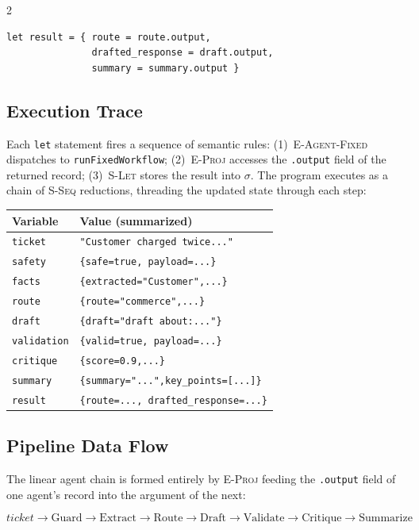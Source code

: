 \documentclass[10pt]{article}
\begin{document}
\begin{multicols}{2}
\begin{lstlisting}[style=awl,
    caption={Customer support triage (abridged)}]
let result = { route = route.output,
               drafted_response = draft.output,
               summary = summary.output }
\end{lstlisting}

\subsection{Execution Trace}

Each \texttt{let} statement fires a sequence of semantic rules:
(1)~\textsc{E-Agent-Fixed} dispatches to \texttt{runFixedWorkflow};
(2)~\textsc{E-Proj} accesses the \texttt{.output} field of the returned
record; (3)~\textsc{S-Let} stores the result into $\sigma$.
The program executes as a chain of \textsc{S-Seq} reductions, threading the
updated state through each step:

\begin{center}
\small
\begin{tabular}{ll}
\toprule
Variable & Value (summarized) \\
\midrule
\texttt{ticket}     & \texttt{"Customer charged twice..."} \\
\texttt{safety}     & \texttt{\{safe=true, payload=...\}} \\
\texttt{facts}      & \texttt{\{extracted="Customer",...\}} \\
\texttt{route}      & \texttt{\{route="commerce",...\}} \\
\texttt{draft}      & \texttt{\{draft="draft about:..."\}} \\
\texttt{validation} & \texttt{\{valid=true, payload=...\}} \\
\texttt{critique}   & \texttt{\{score=0.9,...\}} \\
\texttt{summary}    & \texttt{\{summary="...",key\_points=[...]\}}\\
\texttt{result}     & \texttt{\{route=..., drafted\_response=...\}}\\
\bottomrule
\end{tabular}
\end{center}

\subsection{Pipeline Data Flow}

The linear agent chain is formed entirely by \textsc{E-Proj} feeding
the \texttt{.output} field of one agent's record into the argument of
the next:

\[
\textit{ticket}
\to \text{Guard}
\to \text{Extract}
\to \text{Route}
\to \text{Draft}
\to \text{Validate}
\to \text{Critique}
\to \text{Summarize}
\]


\end{multicols}
\end{document}

